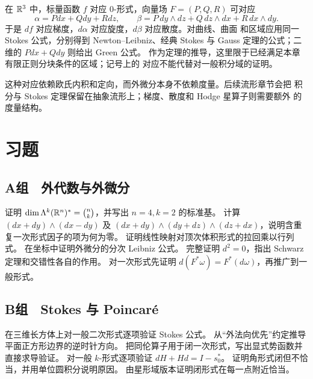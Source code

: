 在 $\mathbb{R}^3$ 中，标量函数 $f$ 对应 $0$-形式，向量场
$F=(P,Q,R)$ 可对应
\[
 \alpha=Pdx+Qdy+Rdz,
 \qquad
 \beta=P\,dy\wedge dz+Q\,dz\wedge dx+R\,dx\wedge dy.
\]
于是 $df$ 对应梯度，$d\alpha$ 对应旋度，$d\beta$ 对应散度。对曲线、曲面
和区域应用同一 Stokes 公式，分别得到 Newton--Leibniz、经典 Stokes 与
Gauss 定理的公式；二维的 $Pdx+Qdy$ 则给出 Green 公式。
作为定理的推导，这里限于已经满足本章有限正则分块条件的区域；记号上的
对应不能代替对一般积分域的证明。

这种对应依赖欧氏内积和定向，而外微分本身不依赖度量。后续流形章节会把
积分与 Stokes 定理保留在抽象流形上；梯度、散度和 Hodge 星算子则需要额外
的度量结构。

\section*{习题}
\subsection*{A组　外代数与外微分}
\begin{enumerate}[label=\textbf{\thechapter.\arabic*.}]
 证明 $\dim\Lambda^k(\mathbb{R}^n)^*=\binom nk$，并写出 $n=4,k=2$ 的标准基。
 计算 $(dx+dy)\wedge(dx-dy)$ 及
 $(dx+dy)\wedge(dy+dz)\wedge(dz+dx)$，说明含重复一次形式因子的项为何为零。
 证明线性映射对顶次体积形式的拉回乘以行列式。
 在坐标中证明外微分的分次 Leibniz 公式。
 完整证明 $d^2=0$，指出 Schwarz 定理和交错性各自的作用。
 对一次形式先证明 $d(F^*\omega)=F^*(d\omega)$，再推广到一般形式。
\end{enumerate}
\subsection*{B组　Stokes 与 Poincaré}
\begin{enumerate}[label=\textbf{\thechapter.\arabic*.},resume]
 在三维长方体上对一般二次形式逐项验证 Stokes 公式。
 从“外法向优先”约定推导平面正方形边界的逆时针方向。
 把同伦算子用于闭一次形式，写出显式势函数并直接求导验证。
 对一般 $k$-形式逐项验证 $dH+Hd=I-s_0^*$。
 证明角形式闭但不恰当，并用单位圆积分说明原因。
 由星形域版本证明闭形式在每一点附近恰当。
\end{enumerate}
